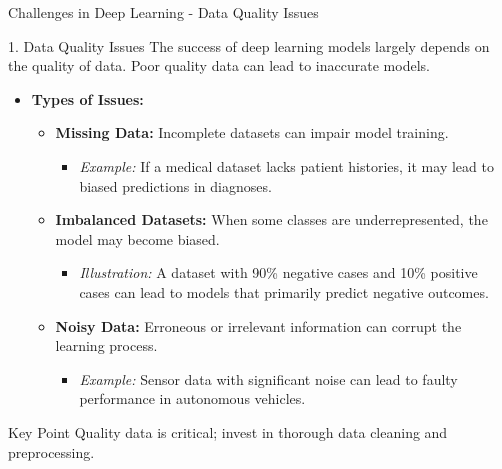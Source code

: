 \documentclass[aspectratio=169]{beamer}
\begin{document}
\begin{frame}[fragile]{Challenges in Deep Learning - Data Quality Issues}
    \begin{block}{1. Data Quality Issues}
        The success of deep learning models largely depends on the quality of data. Poor quality data can lead to inaccurate models.
    \end{block}
    
    \begin{itemize}
        \item \textbf{Types of Issues:}
        \begin{itemize}
            \item \textbf{Missing Data:} Incomplete datasets can impair model training. 
            \begin{itemize}
                \item \textit{Example:} If a medical dataset lacks patient histories, it may lead to biased predictions in diagnoses.
            \end{itemize}
            \item \textbf{Imbalanced Datasets:} When some classes are underrepresented, the model may become biased.
            \begin{itemize}
                \item \textit{Illustration:} A dataset with 90\% negative cases and 10\% positive cases can lead to models that primarily predict negative outcomes.
            \end{itemize}
            \item \textbf{Noisy Data:} Erroneous or irrelevant information can corrupt the learning process.
            \begin{itemize}
                \item \textit{Example:} Sensor data with significant noise can lead to faulty performance in autonomous vehicles.
            \end{itemize}
        \end{itemize}
    \end{itemize}
    
    \begin{block}{Key Point}
        Quality data is critical; invest in thorough data cleaning and preprocessing.
    \end{block}
\end{frame}
\end{document}

